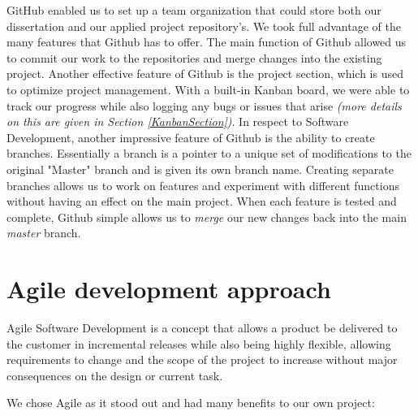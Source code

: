 GitHub enabled us to set up a team organization that could store both our dissertation and our applied project repository's. We took full advantage of the many features that Github has to offer. The main function of Github allowed us to commit our work to the repositories and merge changes into the existing project. Another effective feature of Github is the project section, which is used to optimize project management. With a built-in Kanban board, we were able to track our progress while also logging any bugs or issues that arise \textit{(more details on this are given in Section \ref{KanbanSection})}. In respect to Software Development, another impressive feature of Github is the ability to create branches. Essentially a branch is a pointer to a unique set of modifications to the original "Master" branch and is given its own branch name. Creating separate branches allows us to work on features and experiment with different functions without having an effect on the main project. When each feature is tested and complete, Github simple allows us to \textit{merge} our new changes back into the main \textit{master} branch.

\section{Agile development approach}
Agile Software Development is a concept that allows a product be delivered to the customer in incremental releases while also being highly flexible, allowing requirements to change and the scope of the project to increase without major consequences on the design or current task\cite{agile}.

We chose Agile as it stood out and had many benefits to our own project:

